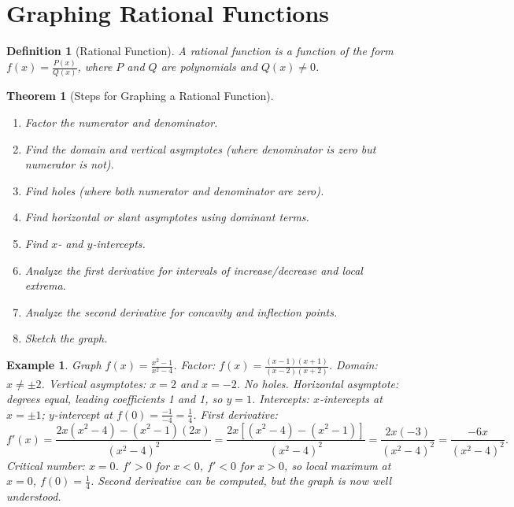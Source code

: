 \documentclass[11pt,a4paper]{article}
\newtheorem{example}{Example}
\newtheorem{theorem}{Theorem}
\newtheorem{definition}{Definition}
\begin{document}
\section{Graphing Rational Functions}
\begin{definition}[Rational Function]
A \textit{rational function} is a function of the form $f(x) = \frac{P(x)}{Q(x)}$, where $P$ and $Q$ are polynomials and $Q(x) \neq 0$.
\end{definition}
\begin{theorem}[Steps for Graphing a Rational Function]
\begin{enumerate}
\item Factor the numerator and denominator.
\item Find the domain and vertical asymptotes (where denominator is zero but numerator is not).
\item Find holes (where both numerator and denominator are zero).
\item Find horizontal or slant asymptotes using dominant terms.
\item Find $x$- and $y$-intercepts.
\item Analyze the first derivative for intervals of increase/decrease and local extrema.
\item Analyze the second derivative for concavity and inflection points.
\item Sketch the graph.
\end{enumerate}
\end{theorem}
\begin{example}
Graph $f(x) = \frac{x^2 - 1}{x^2 - 4}$.
Factor: $f(x) = \frac{(x - 1)(x + 1)}{(x - 2)(x + 2)}$.
Domain: $x \neq \pm 2$. Vertical asymptotes: $x = 2$ and $x = -2$. No holes.
Horizontal asymptote: degrees equal, leading coefficients 1 and 1, so $y = 1$.
Intercepts: $x$-intercepts at $x = \pm 1$; $y$-intercept at $f(0) = \frac{-1}{-4} = \frac{1}{4}$.
First derivative:
\[
f'(x) = \frac{2x(x^2 - 4) - (x^2 - 1)(2x)}{(x^2 - 4)^2} = \frac{2x[(x^2 - 4) - (x^2 - 1)]}{(x^2 - 4)^2} = \frac{2x(-3)}{(x^2 - 4)^2} = \frac{-6x}{(x^2 - 4)^2}.
\]
Critical number: $x = 0$. $f' > 0$ for $x < 0$, $f' < 0$ for $x > 0$, so local maximum at $x = 0$, $f(0) = \frac{1}{4}$.
Second derivative can be computed, but the graph is now well understood.
\end{example}
\end{document}
